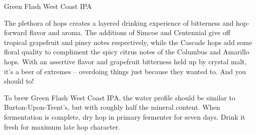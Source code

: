 \begin{recipie}{Green Flash West Coast IPA}

\begin{aboutblock}
The plethora of hops creates a layered drinking experience of bitterness and hop-forward flavor
and aroma. The additions of Simcoe and Centennial give off tropical grapefruit and piney notes
respectively, while the Cascade hops add some floral quality to compliment the spicy citrus notes
of the Columbus and Amarillo hops.
With an assertive flavor and grapefruit bitterness held up by crystal malt, it's a beer of extremes -- overdoing things just because they wanted to. And you should to!
\end{aboutblock}


\begin{methodandtiming}
 
\begin{mashsteps}
\end{mashsteps}

\begin{fermentationsteps}
\end{fermentationsteps}

\begin{directions}
To brew Green Flash West Coast IPA, the water profile should be similar to Burton-Upon-Trent's,
but with roughly half the mineral content. When fermentation is complete, dry hop in primary
fermenter for seven days. Drink it fresh for maximum late hop character.
\end{directions}

\end{methodandtiming}

\pagebreak

\begin{ingredientsblock}

\begin{malts}
\end{malts}

\begin{hops}
\end{hops}


\end{ingredientsblock}
\end{recipie}
